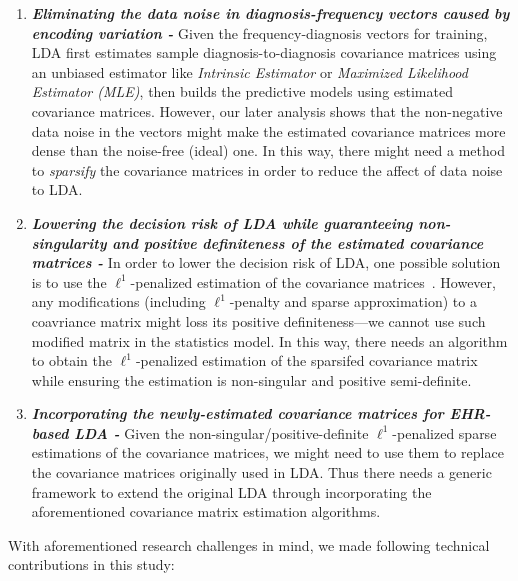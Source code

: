 \documentclass[journal,compsoc]{IEEEtran}
\begin{document}
\begin{enumerate} \item \textbf{\em Eliminating the data noise in diagnosis-frequency vectors caused by encoding variation - }      
Given the frequency-diagnosis vectors for training, LDA first estimates sample diagnosis-to-diagnosis covariance matrices using an unbiased estimator like \emph{Intrinsic Estimator} or \emph{Maximized Likelihood Estimator (MLE)}, then builds the predictive models using estimated covariance matrices.
However, our later analysis shows that the non-negative data noise in the vectors might make the estimated covariance matrices more dense than the noise-free (ideal) one.
In this way, there might need a method to \emph{sparsify} the covariance matrices in order to reduce the affect of data noise to LDA.



\item \textbf{\em Lowering the decision risk of LDA while guaranteeing non-singularity and positive definiteness of the estimated covariance matrices - }      
In order to lower the decision risk of LDA, one possible solution is to use the $\ell^1$-penalized estimation of the covariance matrices~\cite{cai2012minimax,xue2012positive}.
However, any modifications (including $\ell^1$-penalty and sparse approximation) to a coavriance matrix might loss its positive definiteness---we cannot use such modified matrix in the statistics model.
In this way, there needs an algorithm to obtain the $\ell^1$-penalized estimation of the sparsifed covariance matrix while ensuring the estimation is non-singular and positive semi-definite.


\item \textbf{\em Incorporating the newly-estimated covariance matrices for EHR-based LDA - }      
Given the non-singular/positive-definite $\ell^1$-penalized sparse estimations of the  covariance matrices, we might need to use them to replace the covariance matrices originally used in LDA.
Thus there needs a generic framework to extend the original LDA through incorporating the aforementioned covariance matrix estimation algorithms.


\end{enumerate}

With aforementioned research challenges in mind, we made following technical contributions in this study:
\end{document}

